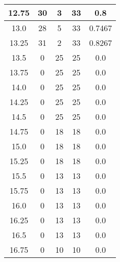 \documentclass[letterpaper, 12pt]{article}
\begin{document}
\begin{longtable}{|c|c|c|c|c|}
\hline
12.75 & 30 & 3 & 33 & 0.8 \\
\hline
13.0 & 28 & 5 & 33 & 0.7467 \\
\hline
13.25 & 31 & 2 & 33 & 0.8267 \\
\hline
13.5 & 0 & 25 & 25 & 0.0 \\
\hline
13.75 & 0 & 25 & 25 & 0.0 \\
\hline
14.0 & 0 & 25 & 25 & 0.0 \\
\hline
14.25 & 0 & 25 & 25 & 0.0 \\
\hline
14.5 & 0 & 25 & 25 & 0.0 \\
\hline
14.75 & 0 & 18 & 18 & 0.0 \\
\hline
15.0 & 0 & 18 & 18 & 0.0 \\
\hline
15.25 & 0 & 18 & 18 & 0.0 \\
\hline
15.5 & 0 & 13 & 13 & 0.0 \\
\hline
15.75 & 0 & 13 & 13 & 0.0 \\
\hline
16.0 & 0 & 13 & 13 & 0.0 \\
\hline
16.25 & 0 & 13 & 13 & 0.0 \\
\hline
16.5 & 0 & 13 & 13 & 0.0 \\
\hline
16.75 & 0 & 10 & 10 & 0.0 \\
\hline
\end{longtable}
\end{document}
